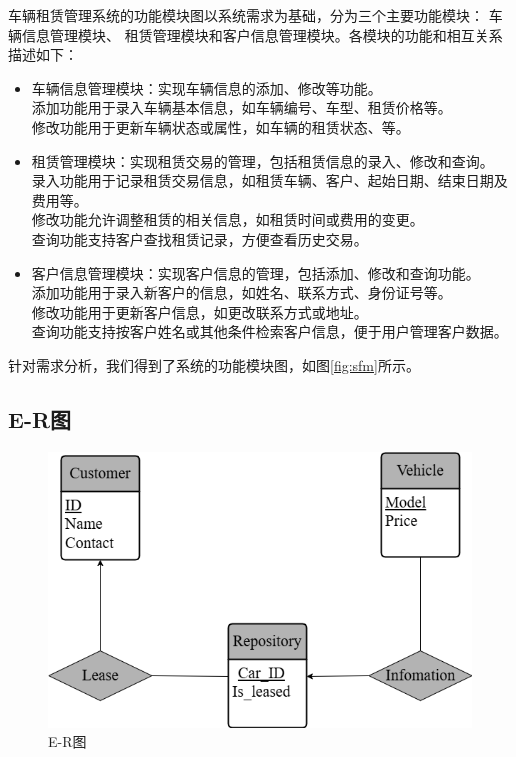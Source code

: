 \documentclass[UTF8,a4paper,12pt]{ctexart}
\begin{document}
车辆租赁管理系统的功能模块图以系统需求为基础，分为三个主要功能模块：
车辆信息管理模块、
租赁管理模块和客户信息管理模块。各模块的功能和相互关系描述如下：

\begin{itemize}
    \item 车辆信息管理模块：实现车辆信息的添加、修改等功能。\\
    添加功能用于录入车辆基本信息，如车辆编号、车型、租赁价格等。\\
    修改功能用于更新车辆状态或属性，如车辆的租赁状态、等。\\
    
    \item 租赁管理模块：实现租赁交易的管理，包括租赁信息的录入、修改和查询。\\
    录入功能用于记录租赁交易信息，如租赁车辆、客户、起始日期、结束日期及费用等。\\
    修改功能允许调整租赁的相关信息，如租赁时间或费用的变更。\\
    查询功能支持客户查找租赁记录，方便查看历史交易。
    \item 客户信息管理模块：实现客户信息的管理，包括添加、修改和查询功能。\\
    添加功能用于录入新客户的信息，如姓名、联系方式、身份证号等。\\
    修改功能用于更新客户信息，如更改联系方式或地址。\\
    查询功能支持按客户姓名或其他条件检索客户信息，便于用户管理客户数据。\\
\end{itemize}

针对需求分析，我们得到了系统的功能模块图，如图\ref{fig:sfm}所示。

\subsection{E-R图}

\begin{figure}[htbp]  %
    \centering  %
    \includegraphics[width=1\textwidth]{pic/er.png}  %
    \caption{E-R图}  %
    \label{fig:er}  %
\end{figure}
\end{document}
